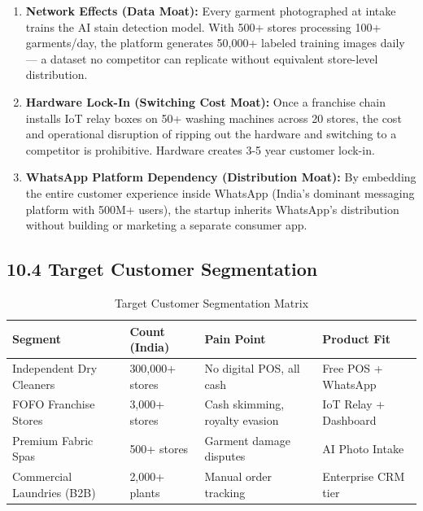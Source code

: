 \documentclass[11pt,a4paper]{article}
\begin{document}
\begin{enumerate}
    \item \textbf{Network Effects (Data Moat):} Every garment photographed at intake trains the AI stain detection model. With 500+ stores processing 100+ garments/day, the platform generates 50,000+ labeled training images daily --- a dataset no competitor can replicate without equivalent store-level distribution.
    \item \textbf{Hardware Lock-In (Switching Cost Moat):} Once a franchise chain installs IoT relay boxes on 50+ washing machines across 20 stores, the cost and operational disruption of ripping out the hardware and switching to a competitor is prohibitive. Hardware creates 3-5 year customer lock-in.
    \item \textbf{WhatsApp Platform Dependency (Distribution Moat):} By embedding the entire customer experience inside WhatsApp (India's dominant messaging platform with 500M+ users), the startup inherits WhatsApp's distribution without building or marketing a separate consumer app.
\end{enumerate}

\subsection{10.4 Target Customer Segmentation}

\begin{table}[h!]
\centering
\small
\begin{tabularx}{\textwidth}{XXXX}
\toprule
\textbf{Segment} & \textbf{Count (India)} & \textbf{Pain Point} & \textbf{Product Fit} \\
\midrule
Independent Dry Cleaners & 300,000+ stores & No digital POS, all cash & Free POS + WhatsApp \\
FOFO Franchise Stores & 3,000+ stores & Cash skimming, royalty evasion & IoT Relay + Dashboard \\
Premium Fabric Spas & 500+ stores & Garment damage disputes & AI Photo Intake \\
Commercial Laundries (B2B) & 2,000+ plants & Manual order tracking & Enterprise CRM tier \\
\bottomrule
\end{tabularx}
\caption{Target Customer Segmentation Matrix}
\end{table}

\end{document}

